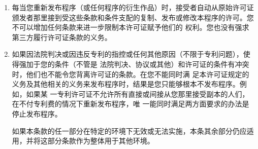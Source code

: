 \begin{enumerate}
    \item 每当您重新发布程序（或任何程序的衍生作品）时，接受者自动从原始许可证颁发者那里接到受这些条款和条件支配的复制、发布或修改本程序的许可。您不可以增加任何条款来进一步限制本许可证赋予他们的 权利。您也没有强求第三方履行许可证条款的义务。
    \item 如果因法院判决或因违反专利的指控或任何其他原因（不限于专利问题），使得强加于您的条件（不管是 法院判决、协议或其他）和许可证的条件有冲突时，他们也不能令您背离许可证的条款。在您不能同时满 足本许可证规定的义务及其他相关的义务来发布程序时，结果是您只能够根本不发布程序。例如，如果某 一专利许可证不允许所有直接或间接从您那里接受副本的人们，在不付专利费的情况下重新发布程序，唯 一能同时满足两方面要求的办法是停止发布程序。


        如果本条款的任一部分在特定的环境下无效或无法实施，本条其余部分仍应适用，并将这部分条款作为整体用于其他环境。



\end{enumerate}
